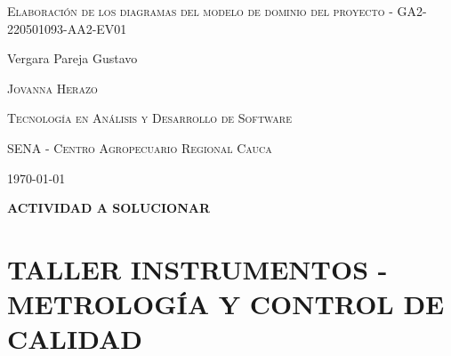 \documentclass{article}
\author{Gustavo Vergara}
\theoremstyle{mytheoremstyle}
\theoremstyle{mytheoremstyle}
\theoremstyle{myproblemstyle}
\begin{document}
\pgfplotsset{compat=1.18}

\begin{titlepage}
	\centering
	\vspace{2.5cm}
	{\scshape \Large Elaboración de los diagramas del modelo de dominio del proyecto - GA2-220501093-AA2-EV01 \par}
	\vspace{5cm}
	\textbf\large\scshape{\par}
	\vspace{0.5cm}

	{\Large Vergara Pareja Gustavo\par}
	\vspace{5cm}
	{\scshape\Large Jovanna Herazo\par}
	\vspace{0.3cm}
	{\scshape\Large Tecnología en Análisis y Desarrollo de Software \par}
	\vspace{0.3cm}
	{\scshape\Large SENA - Centro Agropecuario Regional Cauca\par}
	\vspace{0.3cm}
	{\Large \today \par}
\end{titlepage}
\tableofcontents
\newpage

\large \textbf{ACTIVIDAD A SOLUCIONAR}\\
\vspace{0.1cm}
\section*{TALLER INSTRUMENTOS - METROLOGÍA Y CONTROL DE CALIDAD}
\end{document}
